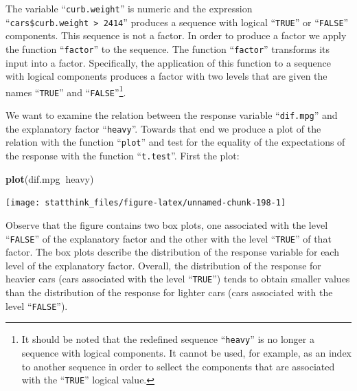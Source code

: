 \documentclass[
]{krantz}
\makeatletter
\newenvironment{Shaded}{\begin{snugshade}}{\end{snugshade}}
\newcommand{\DecValTok}[1]{\textcolor[rgb]{0.00,0.00,0.81}{#1}}
\newcommand{\KeywordTok}[1]{\textcolor[rgb]{0.13,0.29,0.53}{\textbf{#1}}}
\newcommand{\NormalTok}[1]{#1}
\newcommand{\OperatorTok}[1]{\textcolor[rgb]{0.81,0.36,0.00}{\textbf{#1}}}
\newcommand{\StringTok}[1]{\textcolor[rgb]{0.31,0.60,0.02}{#1}}
\newenvironment{kframe}{%
\medskip{}
\setlength{\fboxsep}{.8em}
 \def\at@end@of@kframe{}%
 \ifinner\ifhmode%
  \def\at@end@of@kframe{\end{minipage}}%
  \begin{minipage}{\columnwidth}%
 \fi\fi%
 \def\FrameCommand##1{\hskip\@totalleftmargin \hskip-\fboxsep
 \colorbox{shadecolor}{##1}\hskip-\fboxsep
     \hskip-\linewidth \hskip-\@totalleftmargin \hskip\columnwidth}%
 \MakeFramed {\advance\hsize-\width
   \@totalleftmargin\z@ \linewidth\hsize
   \@setminipage}}%
 {\par\unskip\endMakeFramed%
 \at@end@of@kframe}
\renewenvironment{Shaded}{\begin{kframe}}{\end{kframe}}
\theoremstyle{definition}
\theoremstyle{definition}
\theoremstyle{definition}
\theoremstyle{remark}
\makeatother
\begin{document}
\begin{Shaded}
\end{Shaded}

The variable ``\texttt{curb.weight}'' is numeric and the expression
``\texttt{cars\$curb.weight\ \textgreater{}\ 2414}'' produces a sequence with logical ``\texttt{TRUE}'' or
``\texttt{FALSE}'' components. This sequence is not a factor. In order to produce
a factor we apply the function ``\texttt{factor}'' to the sequence. The function
``\texttt{factor}'' transforms its input into a factor. Specifically, the
application of this function to a sequence with logical components
produces a factor with two levels that are given the names ``\texttt{TRUE}'' and
``\texttt{FALSE}''\footnote{It should be noted that the redefined sequence ``\texttt{heavy}'' is no
  longer a sequence with logical components. It cannot be used, for
  example, as an index to another sequence in order to sellect the
  components that are associated with the ``\texttt{TRUE}'' logical value.}.

We want to examine the relation between the response variable
``\texttt{dif.mpg}'' and the explanatory factor ``\texttt{heavy}''. Towards that end we
produce a plot of the relation with the function ``\texttt{plot}'' and test for
the equality of the expectations of the response with the function
``\texttt{t.test}''. First the plot:

\begin{Shaded}
\begin{Highlighting}[]
\KeywordTok{plot}\NormalTok{(dif.mpg}\OperatorTok{~}\NormalTok{heavy)}
\end{Highlighting}
\end{Shaded}

\begin{center}\texttt{[image: statthink\_files/figure-latex/unnamed-chunk-198-1]} \end{center}

Observe that the figure contains two box plots, one associated with the
level ``\texttt{FALSE}'' of the explanatory factor and the other with the level
``\texttt{TRUE}'' of that factor. The box plots describe the distribution of the
response variable for each level of the explanatory factor. Overall, the
distribution of the response for heavier cars (cars associated with the
level ``\texttt{TRUE}'') tends to obtain smaller values than the distribution of
the response for lighter cars (cars associated with the level
``\texttt{FALSE}'').
\end{document}
